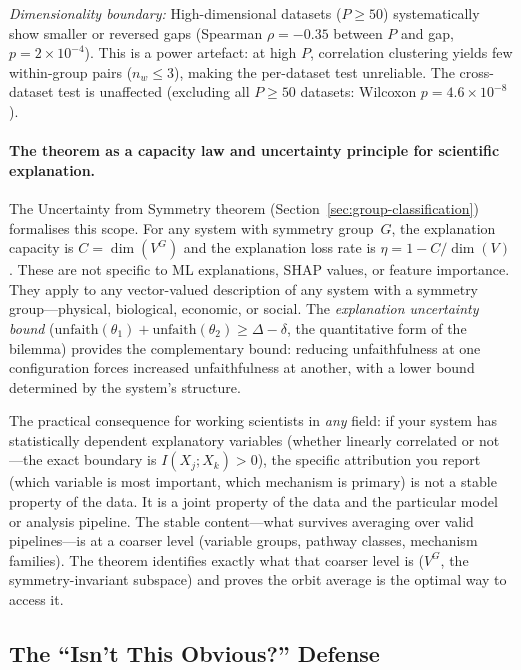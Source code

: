 \documentclass[11pt,a4paper]{article}
\begin{document}
\emph{Dimensionality boundary:} High-dimensional datasets ($P \geq 50$) systematically show smaller or reversed gaps (Spearman $\rho = -0.35$ between $P$ and gap, $p = 2 \times 10^{-4}$).  This is a power artefact: at high $P$, correlation clustering yields few within-group pairs ($n_w \leq 3$), making the per-dataset test unreliable.  The cross-dataset test is unaffected (excluding all $P \geq 50$ datasets: Wilcoxon $p = 4.6 \times 10^{-8}$).

\paragraph{The theorem as a capacity law and uncertainty principle for scientific explanation.}
The Uncertainty from Symmetry theorem (Section~\ref{sec:group-classification}) formalises this scope.  For any system with symmetry group~$G$, the explanation capacity is $C = \dim(V^G)$ and the explanation loss rate is $\eta = 1 - C/\dim(V)$.  These are not specific to ML explanations, SHAP values, or feature importance.  They apply to any vector-valued description of any system with a symmetry group---physical, biological, economic, or social.  The \emph{explanation uncertainty bound} ($\mathrm{unfaith}(\theta_1) + \mathrm{unfaith}(\theta_2) \geq \Delta - \delta$, the quantitative form of the bilemma) provides the complementary bound: reducing unfaithfulness at one configuration forces increased unfaithfulness at another, with a lower bound determined by the system's structure.

The practical consequence for working scientists in \emph{any} field: if your system has statistically dependent explanatory variables (whether linearly correlated or not---the exact boundary is $I(X_j; X_k) > 0$), the specific attribution you report (which variable is most important, which mechanism is primary) is not a stable property of the data.  It is a joint property of the data and the particular model or analysis pipeline.  The stable content---what survives averaging over valid pipelines---is at a coarser level (variable groups, pathway classes, mechanism families).  The theorem identifies exactly what that coarser level is ($V^G$, the symmetry-invariant subspace) and proves the orbit average is the optimal way to access it.

\subsection[The Isn't This Obvious Defense]{The ``Isn't This Obvious?'' Defense}
\label{sec:obvious}
\end{document}
